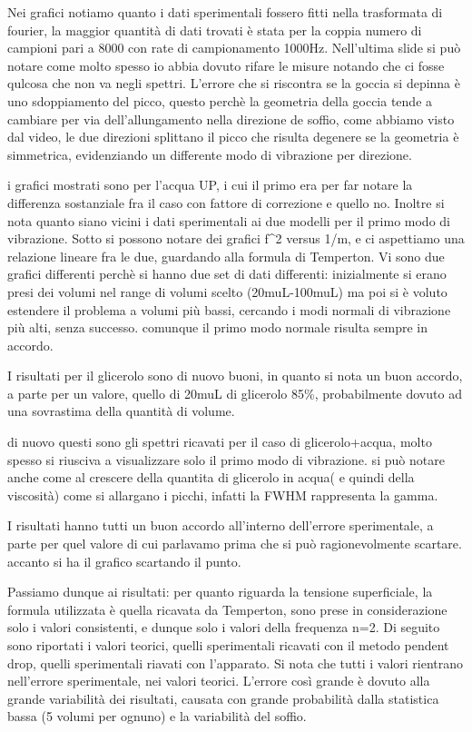 Nei grafici notiamo quanto i dati sperimentali fossero fitti nella trasformata di fourier, la maggior quantità di dati trovati è stata per la coppia numero di campioni pari a 8000 con rate di campionamento 1000Hz.
Nell'ultima slide si può notare come molto spesso io abbia dovuto rifare le misure notando che ci fosse qulcosa che non va negli spettri. L'errore che si riscontra se la goccia si depinna è uno sdoppiamento del picco, questo perchè la geometria della goccia tende a cambiare per via dell'allungamento nella direzione de soffio, come abbiamo visto dal video, le due direzioni splittano il picco che risulta degenere se la geometria è simmetrica, evidenziando un differente modo di vibrazione per direzione.


i grafici mostrati sono per l'acqua UP, i cui il primo era per far notare la differenza sostanziale fra il caso con fattore di correzione e quello no. Inoltre si nota quanto siano vicini i dati sperimentali ai due modelli per il primo modo di vibrazione.
Sotto si possono notare dei grafici f^2 versus 1/m, e ci aspettiamo una relazione lineare fra le due, guardando alla formula di Temperton. Vi sono due grafici differenti perchè si hanno due set di dati differenti: inizialmente si erano presi dei volumi nel range di volumi scelto (20muL-100muL) ma poi si è voluto estendere il problema a volumi più bassi, cercando i modi normali di vibrazione più alti, senza successo. comunque il primo modo normale risulta sempre in accordo.

I risultati per il glicerolo sono di nuovo buoni, in quanto si nota un buon accordo, a parte per un valore, quello di 20muL di glicerolo 85\%, probabilmente dovuto ad una sovrastima della quantità di volume.

di nuovo questi sono gli spettri ricavati per il caso di glicerolo+acqua, molto spesso si riusciva a visualizzare solo il primo modo di vibrazione. si può notare anche come al crescere della quantita di glicerolo in acqua( e quindi della viscosità) come si allargano i picchi, infatti la FWHM rappresenta la gamma.

I risultati hanno tutti un buon accordo all'interno dell'errore sperimentale, a parte per quel valore di cui parlavamo prima che si può ragionevolmente scartare. accanto si ha il grafico scartando il punto.

Passiamo dunque ai risultati: per quanto riguarda la tensione superficiale, la formula utilizzata è quella ricavata da Temperton, sono prese in considerazione solo i valori consistenti, e dunque solo i valori della frequenza n=2.
Di seguito sono riportati i valori teorici, quelli sperimentali ricavati con il metodo pendent drop, quelli sperimentali riavati con l'apparato. Si nota che tutti i valori rientrano nell'errore sperimentale, nei valori teorici. L'errore così grande è dovuto alla grande variabilità dei risultati, causata con grande probabilità dalla statistica bassa (5 volumi per ognuno) e la variabilità del soffio.

